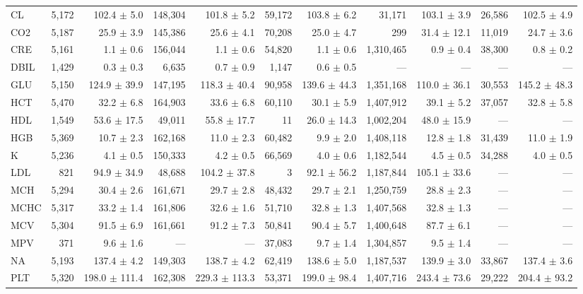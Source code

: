 \begin{table}[ht]
\begin{tabular}{lrrrrrrrrrr}
CL & 5,172 & 102.4 $\pm$ 5.0 & 148,304 & 101.8 $\pm$ 5.2 & 59,172 & 103.8 $\pm$ 6.2 & 31,171 & 103.1 $\pm$ 3.9 & 26,586 & 102.5 $\pm$ 4.9 \\
CO2 & 5,187 & 25.9 $\pm$ 3.9 & 145,386 & 25.6 $\pm$ 4.1 & 70,208 & 25.0 $\pm$ 4.7 & 299 & 31.4 $\pm$ 12.1 & 11,019 & 24.7 $\pm$ 3.6 \\
CRE & 5,161 & 1.1 $\pm$ 0.6 & 156,044 & 1.1 $\pm$ 0.6 & 54,820 & 1.1 $\pm$ 0.6 & 1,310,465 & 0.9 $\pm$ 0.4 & 38,300 & 0.8 $\pm$ 0.2 \\
DBIL & 1,429 & 0.3 $\pm$ 0.3 & 6,635 & 0.7 $\pm$ 0.9 & 1,147 & 0.6 $\pm$ 0.5 & --- & --- & --- & --- \\
GLU & 5,150 & 124.9 $\pm$ 39.9 & 147,195 & 118.3 $\pm$ 40.4 & 90,958 & 139.6 $\pm$ 44.3 & 1,351,168 & 110.0 $\pm$ 36.1 & 30,553 & 145.2 $\pm$ 48.3 \\
HCT & 5,470 & 32.2 $\pm$ 6.8 & 164,903 & 33.6 $\pm$ 6.8 & 60,110 & 30.1 $\pm$ 5.9 & 1,407,912 & 39.1 $\pm$ 5.2 & 37,057 & 32.8 $\pm$ 5.8 \\
HDL & 1,549 & 53.6 $\pm$ 17.5 & 49,011 & 55.8 $\pm$ 17.7 & 11 & 26.0 $\pm$ 14.3 & 1,002,204 & 48.0 $\pm$ 15.9 & --- & --- \\
HGB & 5,369 & 10.7 $\pm$ 2.3 & 162,168 & 11.0 $\pm$ 2.3 & 60,482 & 9.9 $\pm$ 2.0 & 1,408,118 & 12.8 $\pm$ 1.8 & 31,439 & 11.0 $\pm$ 1.9 \\
K & 5,236 & 4.1 $\pm$ 0.5 & 150,333 & 4.2 $\pm$ 0.5 & 66,569 & 4.0 $\pm$ 0.6 & 1,182,544 & 4.5 $\pm$ 0.5 & 34,288 & 4.0 $\pm$ 0.5 \\
LDL & 821 & 94.9 $\pm$ 34.9 & 48,688 & 104.2 $\pm$ 37.8 & 3 & 92.1 $\pm$ 56.2 & 1,187,844 & 105.1 $\pm$ 33.6 & --- & --- \\
MCH & 5,294 & 30.4 $\pm$ 2.6 & 161,671 & 29.7 $\pm$ 2.8 & 48,432 & 29.7 $\pm$ 2.1 & 1,250,759 & 28.8 $\pm$ 2.3 & --- & --- \\
MCHC & 5,317 & 33.2 $\pm$ 1.4 & 161,806 & 32.6 $\pm$ 1.6 & 51,710 & 32.8 $\pm$ 1.3 & 1,407,568 & 32.8 $\pm$ 1.3 & --- & --- \\
MCV & 5,304 & 91.5 $\pm$ 6.9 & 161,661 & 91.2 $\pm$ 7.3 & 50,841 & 90.4 $\pm$ 5.7 & 1,400,648 & 87.7 $\pm$ 6.1 & --- & --- \\
MPV & 371 & 9.6 $\pm$ 1.6 & --- & --- & 37,083 & 9.7 $\pm$ 1.4 & 1,304,857 & 9.5 $\pm$ 1.4 & --- & --- \\
NA & 5,193 & 137.4 $\pm$ 4.2 & 149,303 & 138.7 $\pm$ 4.2 & 62,419 & 138.6 $\pm$ 5.0 & 1,187,537 & 139.9 $\pm$ 3.0 & 33,867 & 137.4 $\pm$ 3.6 \\
PLT & 5,320 & 198.0 $\pm$ 111.4 & 162,308 & 229.3 $\pm$ 113.3 & 53,371 & 199.0 $\pm$ 98.4 & 1,407,716 & 243.4 $\pm$ 73.6 & 29,222 & 204.4 $\pm$ 93.2 \\

\end{tabular}
\end{table}
